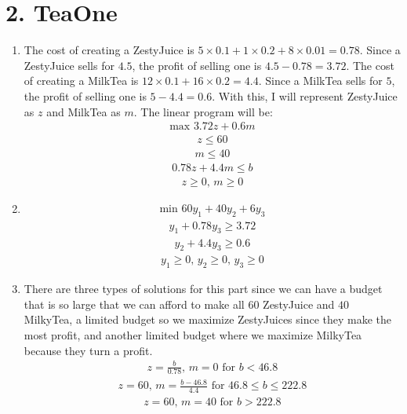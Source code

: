 \documentclass[11pt]{article}
\begin{document}
\newpage
\section*{2. TeaOne}
\begin{enumerate}[label=(\alph*)]
\item
The cost of creating a ZestyJuice is $5 \times 0.1 + 1 \times 0.2 + 8 \times 0.01 = 0.78$. Since a ZestyJuice sells for $4.5$, the profit of selling one is $4.5 - 0.78 = 3.72$. The cost of creating a MilkTea is $12 \times 0.1 + 16 \times 0.2 = 4.4$. Since a MilkTea sells for $5$, the profit of selling one is $5 - 4.4 = 0.6$. With this, I will represent ZestyJuice as $z$ and MilkTea as $m$. The linear program will be:
\begin{align*}
\text{max } 3.72 z + 0.6 m
\end{align*}
\begin{align*}
z \leq 60
\end{align*}
\begin{align*}
m \leq 40
\end{align*}
\begin{align*}
0.78 z + 4.4 m \leq b
\end{align*}
\begin{align*}
z \geq 0 \text{, } m \geq 0
\end{align*}



\item
\begin{align*}
\text{min } 60 y_1 + 40 y_2 + 6 y_3
\end{align*}
\begin{align*}
y_1 + 0.78 y_3 \geq 3.72
\end{align*}
\begin{align*}
y_2 + 4.4 y_3 \geq 0.6
\end{align*}
\begin{align*}
y_1 \geq 0 \text{, } y_2 \geq 0 \text{, } y_3 \geq 0
\end{align*}
\item
There are three types of solutions for this part since we can have a budget that is so large that we can afford to make all $60$ ZestyJuice and $40$ MilkyTea, a limited budget so we maximize ZestyJuices since they make the most profit, and another limited budget where we maximize MilkyTea because they turn a profit.
\begin{align*}
z = \frac{b} {0.78} \text{, } m = 0 \text{ for } b < 46.8
\end{align*}
\begin{align*}
z = 60 \text{, } m = \frac{b - 46.8} {4.4} \text{ for } 46.8 \leq b \leq 222.8
\end{align*}
\begin{align*}
z = 60 \text{, } m = 40 \text{ for } b > 222.8
\end{align*}
\end{enumerate}
\end{document}
